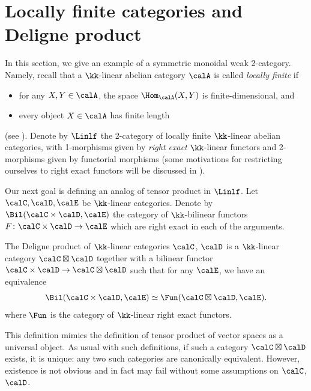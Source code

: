 \section{Locally finite categories and Deligne product}
\label{s:deligne-product}
In this section, we give an example of a symmetric monoidal weak 2-category.
Namely, recall that a $\kk$-linear abelian category $\calA$ is called
\emph{locally finite} if
\begin{itemize}
    \item for any $X,Y\in \calA$, the space $\Hom_{\calA}(X,Y)$ is
      finite-dimensional, and
    \item every object $X\in \calA$ has finite length
\end{itemize}
(see \cite[Section 1.8]{etingof-fusion}). Denote by $\Linlf$ the 2-category
of locally finite $\kk$-linear abelian categories, with 1-morphisms given by
\emph{right exact} $\kk$-linear functors and 2-morphisms given by functorial
morphisms (some motivations for restricting ourselves to right exact
functors will be discussed in ). %


Our next goal is defining an analog of tensor product in $\Linlf$.
Let $\calC, \calD, \calE$ be $\kk$-linear categories. Denote by
$\Bil(\calC\times\calD, \calE)$ the category of $\kk$-bilinear functors $F\colon
\calC\times\calD\to \calE$ which are right exact in each of the arguments.

\begin{definition}\label{d:deligne-product}
  The Deligne product of $\kk$-linear categories $\calC$, $\calD$ is a
  $\kk$-linear category $\calC\boxtimes \calD$ together with a bilinear functor
  $\calC\times\calD\to \calC\boxtimes\calD$ such that for any $\calE$, we have
  an equivalence
  $$
    \Bil(\calC\times\calD, \calE)\simeq \Fun(\calC\boxtimes\calD, \calE).
  $$
  where $\Fun$ is the category of $\kk$-linear right exact functors.
\end{definition}
This definition mimics the definition of tensor product of vector spaces as a
universal object. As usual with such definitions, if such a category
$\calC\boxtimes\calD$ exists, it is unique: any two such categories are
canonically equivalent. However, existence is not obvious and in fact may fail
without some assumptions on $\calC$, $\calD$.

